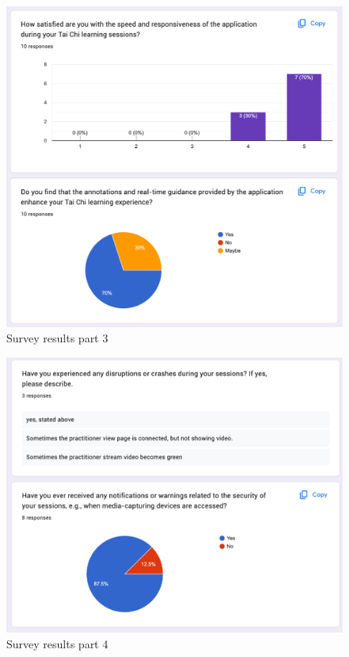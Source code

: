 \documentclass[12pt, titlepage]{article}
\begin{document}
\begin{figure}[!]
  \centering
  \includegraphics[width=1.0\linewidth]{surveyp3.png}
  \caption{Survey results part 3}
  \label{fig:surveyp3}
\end{figure}

\begin{figure}[!]
  \centering
  \includegraphics[width=1.0\linewidth]{surveyp4.png}
  \caption{Survey results part 4}
  \label{fig:surveyp4}
\end{figure}
\end{document}
